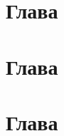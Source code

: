 \newpage
{}



\newpage\section{Глава}



\newpage\section{Глава}



\newpage\section{Глава}



\newpage{}